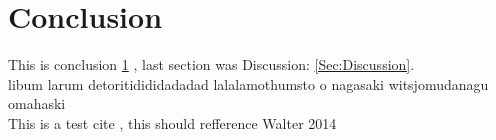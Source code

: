\section{Conclusion}\label{Sec:Conclusion}
This is conclusion \ref{Sec:Conclusion} , last section was Discussion: \ref{Sec:Discussion}.\\
libum larum detoritidididadadad lalalamothumsto o nagasaki witsjomudanagu omahaski \\
This is a test cite \cite{Walter:2014}, this should refference Walter 2014